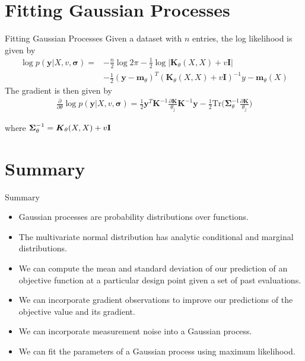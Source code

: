 \documentclass{beamer}
\begin{document}
\section{Fitting Gaussian Processes}
\begin{frame}{Fitting Gaussian Processes}
Given a dataset with $n$ entries, the log likelihood is given by
\begin{equation*}
\begin{split}
    \log p(\boldsymbol{y}|X, v, \boldsymbol{\sigma}) =& 
    -\frac{n}{2}\log{2\pi} - \frac{1}{2}\log |\boldsymbol{K}_\theta(X, X) + v\boldsymbol{I}|\\
    &-\frac{1}{2}(\boldsymbol{y}-\boldsymbol{m}_\theta)^T (\boldsymbol{K}_\theta(X, X) + v\boldsymbol{I})^{-1}
    y-\boldsymbol{m}_\theta(X)    
\end{split}
\end{equation*}
The gradient is then given by
\begin{equation*}
\begin{split}
    \frac{\partial}{\partial \theta} \log p(\boldsymbol{y}|X, v, \boldsymbol{\sigma}) =
    \frac{1}{2}\boldsymbol{y}^T \boldsymbol{K}^{-1} \frac{\partial \boldsymbol{K}}{\theta_j} \boldsymbol{K}^{-1} \boldsymbol{y}
    - \frac{1}{2}\textrm{Tr}\bigg(\boldsymbol{\Sigma}^{-1}_{\theta} \frac{\partial \boldsymbol{K}}{\theta_j} \bigg)
\end{split}
\end{equation*}

where $\boldsymbol{\Sigma}^{-1}_{\theta} = \boldsymbol{K}_\theta(X, X) + v{\bf I}$

\end{frame}


\section{Summary}
\begin{frame}{Summary}
    \begin{itemize}
        \item Gaussian processes are probability distributions over functions.
        \item The multivariate normal distribution has analytic conditional and marginal distributions.
        \item We can compute the mean and standard deviation of our prediction of an objective function at a particular design point given a set of past evaluations.
        \item We can incorporate gradient observations to improve our predictions of the objective value and its gradient.
        \item We can incorporate measurement noise into a Gaussian process.
        \item We can fit the parameters of a Gaussian process using maximum likelihood.
    \end{itemize}
\end{frame}
\end{document}

